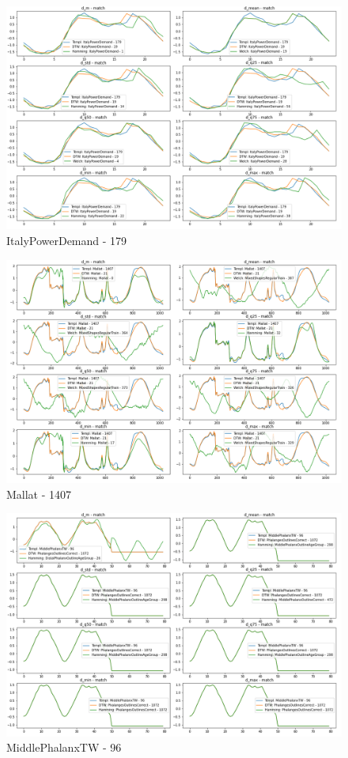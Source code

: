 \documentclass[phd,black, hidelinks]{PrincetonThesis}
\begin{document}
\begin{figure}[htbp]
\centering
\includegraphics[width=.9\linewidth]{./img/dtw_comp_res/ItalyPowerDemand_179.png}
\caption{\label{fig:org26ae65b}ItalyPowerDemand - 179}
\end{figure}

\begin{figure}[htbp]
\centering
\includegraphics[width=.9\linewidth]{./img/dtw_comp_res/Mallat_1407.png}
\caption{\label{fig:orgfb1f273}Mallat - 1407}
\end{figure}

\begin{figure}[htbp]
\centering
\includegraphics[width=.9\linewidth]{./img/dtw_comp_res/MiddlePhalanxTW_96.png}
\caption{\label{fig:org4449995}MiddlePhalanxTW - 96}
\end{figure}
\end{document}
